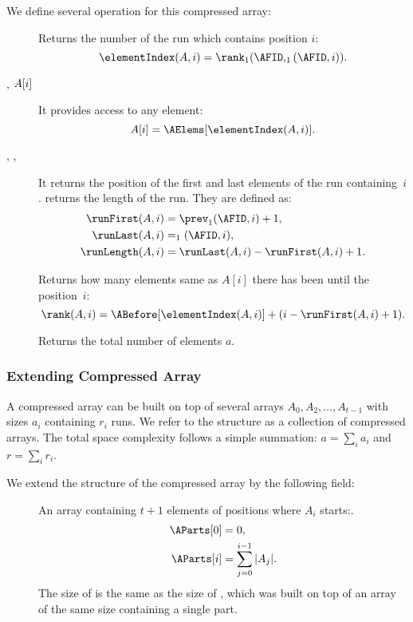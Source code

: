 We define several operation for this compressed array:
\begin{description}
	\item[\elementIndex{}]
	Returns the number of the run which contains position $i$:
	$$ \elementIndex(A, i) = \rank_1(\AFID, \succ_1(\AFID, i)). $$

	\item[\inspect{}, $A[i\char93$]
	It provides access to any element:
	$$ A[i] = \AElems[\elementIndex(A, i)]. $$

	\item[\runFirst{}, \runLast{}, \runLength{}]
	It returns the position of the first and last elements of the run containing~$i$.
	\runLength{} returns the length of the run.
	They are defined as:
	\begin{align*}
		\runFirst(A, i) &= \prev_1(\AFID, i) + 1, \\
		\runLast(A, i) &= \succ_1(\AFID, i), \\
		\runLength(A, i) &= \runLast(A, i) - \runFirst(A, i) + 1.
	\end{align*}
	
	\item[\rank{}]
	Returns how many elements same as $A[i]$ there has been until the position~$i$:
	$$ \rank(A, i) = \ABefore[\elementIndex(A, i)] + (i - \runFirst(A, i) + 1). $$
	
	\item[\size{}]
	Returns the total number of elements $a$.
\end{description}

\subsubsection{Extending Compressed Array}

A compressed array can be built on top of several arrays $A_0, A_2, \ldots, A_{t-1}$ with sizes $a_i$ containing $r_i$ runs.
We refer to the structure as a collection of compressed arrays.
The total space complexity follows a simple summation: $a = \sum_i a_i$ and $r = \sum_i r_i$.

We extend the structure of the compressed array by the following field:
\begin{description}
	\item[\AParts{}]
	An array containing $t + 1$ elements of positions where $A_i$ starts:.
	\begin{align*}
		\AParts[0] &= 0, \\
		\AParts[i] &= \sum_{j = 0}^{i - 1} |A_{j}|.
	\end{align*}
	The size of \AParts{} is the same as the size of \ABefore{}, which was built on top of an array of the same size containing a single part.
\end{description}

